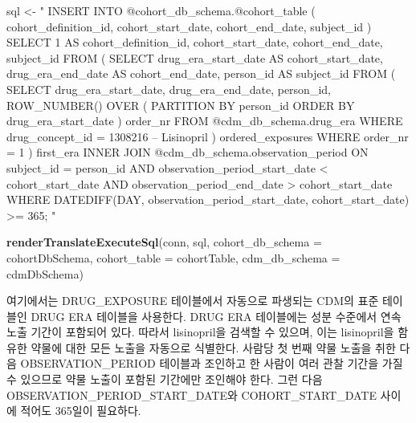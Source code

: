 \documentclass[10.5pt]{book}
\newenvironment{Shaded}{\begin{snugshade}}{\end{snugshade}}
\newcommand{\KeywordTok}[1]{\textcolor[rgb]{0.13,0.29,0.53}{\textbf{#1}}}
\newcommand{\DataTypeTok}[1]{\textcolor[rgb]{0.13,0.29,0.53}{#1}}
\newcommand{\StringTok}[1]{\textcolor[rgb]{0.31,0.60,0.02}{#1}}
\newcommand{\NormalTok}[1]{#1}
\theoremstyle{definition}
\theoremstyle{definition}
\theoremstyle{definition}
\theoremstyle{remark}
\begin{document}
\begin{Shaded}
\begin{Highlighting}[]
\NormalTok{sql <-}\StringTok{ "}
\StringTok{INSERT INTO @cohort_db_schema.@cohort_table (}
\StringTok{  cohort_definition_id,}
\StringTok{  cohort_start_date,}
\StringTok{  cohort_end_date,}
\StringTok{  subject_id}
\StringTok{)}
\StringTok{SELECT 1 AS cohort_definition_id,}
\StringTok{  cohort_start_date,}
\StringTok{  cohort_end_date,}
\StringTok{  subject_id}
\StringTok{FROM (}
\StringTok{  SELECT drug_era_start_date AS cohort_start_date,}
\StringTok{    drug_era_end_date AS cohort_end_date,}
\StringTok{    person_id AS subject_id}
\StringTok{  FROM (}
\StringTok{    SELECT drug_era_start_date,}
\StringTok{      drug_era_end_date,}
\StringTok{      person_id,}
\StringTok{      ROW_NUMBER() OVER (}
\StringTok{        PARTITION BY person_id}
\StringTok{            ORDER BY drug_era_start_date}
\StringTok{      ) order_nr}
\StringTok{    FROM @cdm_db_schema.drug_era}
\StringTok{    WHERE drug_concept_id = 1308216 -- Lisinopril}
\StringTok{  ) ordered_exposures}
\StringTok{  WHERE order_nr = 1}
\StringTok{) first_era}
\StringTok{INNER JOIN @cdm_db_schema.observation_period}
\StringTok{  ON subject_id = person_id}
\StringTok{    AND observation_period_start_date < cohort_start_date}
\StringTok{    AND observation_period_end_date > cohort_start_date}
\StringTok{WHERE DATEDIFF(DAY,}
\StringTok{               observation_period_start_date,}
\StringTok{               cohort_start_date) >= 365;}
\StringTok{"}

\KeywordTok{renderTranslateExecuteSql}\NormalTok{(conn, sql,}
                          \DataTypeTok{cohort_db_schema =}\NormalTok{ cohortDbSchema,}
                          \DataTypeTok{cohort_table =}\NormalTok{ cohortTable,}
                          \DataTypeTok{cdm_db_schema =}\NormalTok{ cdmDbSchema)}
\end{Highlighting}
\end{Shaded}

여기에서는 DRUG\_EXPOSURE 테이블에서 자동으로 파생되는 CDM의 표준
테이블인 DRUG ERA 테이블을 사용한다. DRUG ERA 테이블에는 성분 수준에서
연속 노출 기간이 포함되어 있다. 따라서 lisinopril을 검색할 수 있으며,
이는 lisinopril을 함유한 약물에 대한 모든 노출을 자동으로 식별한다.
사람당 첫 번째 약물 노출을 취한 다음 OBSERVATION\_PERIOD 테이블과
조인하고 한 사람이 여러 관찰 기간을 가질 수 있으므로 약물 노출이 포함된
기간에만 조인해야 한다. 그런 다음 OBSERVATION\_PERIOD\_START\_DATE와
COHORT\_START\_DATE 사이에 적어도 365일이 필요하다.
\end{document}
